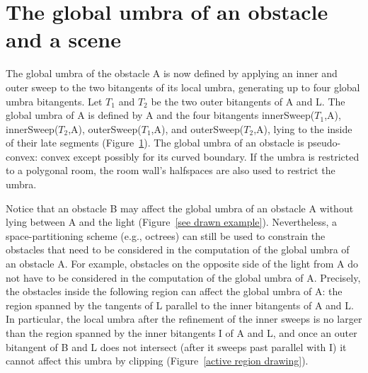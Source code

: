 \documentclass[9pt]{article}
\begin{document}

\section{The global umbra of an obstacle and a scene}


The global umbra of the obstacle A is now defined by applying
an inner and outer sweep to the two bitangents of its local umbra,
generating up to four global umbra bitangents.
Let $T_1$ and $T_2$ be the two outer bitangents of A and L.
The global umbra of A is defined by A and the four bitangents
innerSweep($T_1$,A), innerSweep($T_2$,A),
outerSweep($T_1$,A), and outerSweep($T_2$,A),
lying to the inside of their late segments (Figure~\ref{}).
The global umbra of an obstacle is pseudo-convex: convex except possibly
for its curved boundary.
If the umbra is restricted to a polygonal room,
the room wall's halfspaces are also used to restrict the umbra.

Notice that an obstacle B may affect the global umbra of an obstacle A
without lying between A and the light (Figure~\ref{see drawn example}).
Nevertheless, a space-partitioning scheme (e.g., octrees) can still 
be used to constrain
the obstacles that need to be considered in the computation of the global
umbra of an obstacle A.
For example, obstacles on the opposite side of the light from A 
do not have to be considered in the computation of the global umbra of A.
Precisely, the obstacles inside the following region can affect the 
global umbra of A: the region spanned by the tangents of L parallel to 
the inner bitangents of A and L.
In particular, the local umbra after the refinement of the inner sweeps
is no larger than the region spanned by the inner bitangents I of A and L,
and once an outer bitangent of B and L does not intersect
(after it sweeps past parallel with I)
it cannot affect this umbra by clipping (Figure~\ref{active region drawing}).
\end{document}
